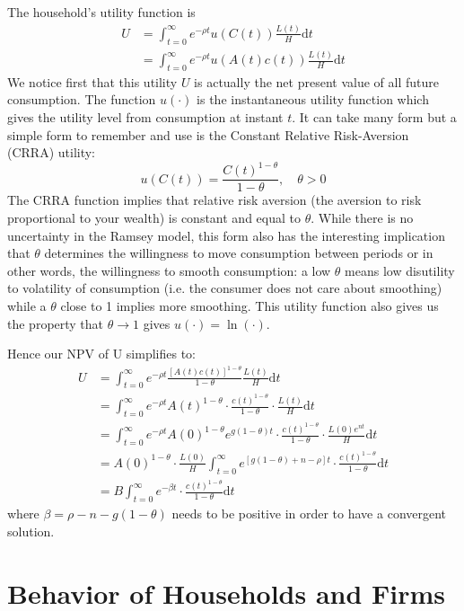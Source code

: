 \documentclass[12pt]{report}
\def\D{\mathrm{d}}
\begin{document}
The household's utility function is\begin{align*}
U & = \int_{t=0}^{\infty} e^{-\rho t} u(C(t))\frac{L(t)}{H}\D t \\
& = \int_{t=0}^{\infty} e^{-\rho t} u(A(t)c(t))\frac{L(t)}{H}\D t
\end{align*}
We notice first that this utility $U$ is actually the net present value of all future consumption. The function $u(\cdot)$ is the instantaneous utility function which gives the utility level from consumption at instant $t$. It can take many form but a simple form to remember and use is the Constant Relative Risk-Aversion (CRRA) utility: $$ u(C(t)) = \frac{C(t)^{1-\theta}}{1 - \theta}, \quad \theta > 0 $$ The CRRA function implies that relative risk aversion (the aversion to risk proportional to your wealth) is constant and equal to $\theta$. While there is no uncertainty in the Ramsey model, this form also has the interesting implication that $\theta$ determines the willingness to move consumption between periods or in other words, the willingness to smooth consumption: a low $\theta$ means low disutility to volatility of consumption (i.e. the consumer does not care about smoothing) while a $\theta$ close to 1 implies more smoothing. This utility function also gives us the property that $\theta\to 1$ gives $u(\cdot) = \ln(\cdot)$.

Hence our NPV of U simplifies to:\begin{align*}
U & = \int_{t=0}^{\infty} e^{-\rho t} \frac{[A(t)c(t)]^{1-\theta}}{1 - \theta} \frac{L(t)}{H}\D t \\
& = \int_{t=0}^{\infty} e^{-\rho t} A(t)^{1-\theta}\cdot \frac{c(t)^{1-\theta}}{1 - \theta} \cdot \frac{L(t)}{H}\D t \\
& = \int_{t=0}^{\infty} e^{-\rho t} A(0)^{1-\theta}e^{g(1-\theta)t}\cdot \frac{c(t)^{1-\theta}}{1 - \theta} \cdot \frac{L(0)e^{nt}}{H}\D t \\
& = A(0)^{1-\theta}\cdot \frac{L(0)}{H} \int_{t=0}^{\infty} e^{[g(1-\theta) + n -\rho] t}\cdot \frac{c(t)^{1-\theta}}{1 - \theta}\D t \\
& = B \int_{t=0}^{\infty} e^{-\beta t}\cdot \frac{c(t)^{1-\theta}}{1 - \theta}\D t
\end{align*}  where $\beta = \rho - n - g(1-\theta)$ needs to be positive in order to have a convergent solution.

\section{Behavior of Households and Firms}
\end{document}
